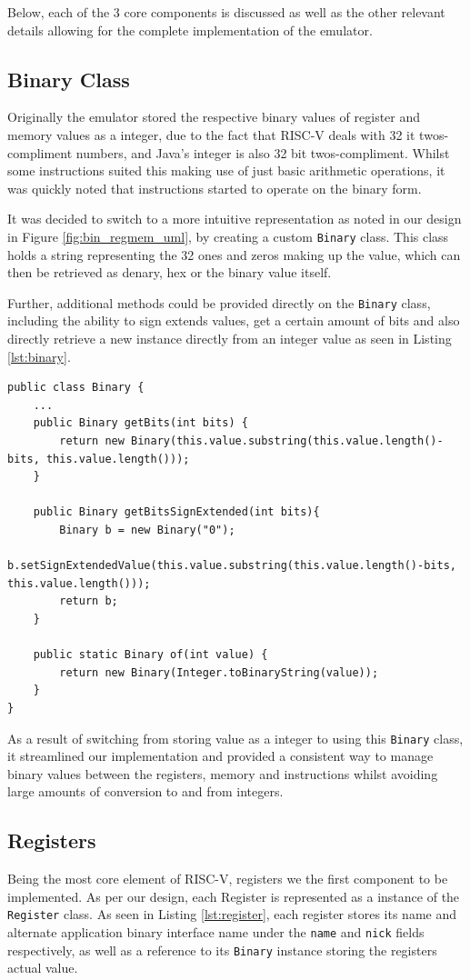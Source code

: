 Below, each of the 3 core components is discussed as well as the other relevant details allowing for the complete implementation of the emulator.

\subsection{Binary Class}
Originally the emulator stored the respective binary values of register and memory values as a integer, due to the fact that RISC-V deals with 32 it twos-compliment numbers, and Java's integer is also 32 bit twos-compliment. Whilst some instructions suited this making use of just basic arithmetic operations, it was quickly noted that instructions started to operate on the binary form.

It was decided to switch to a more intuitive representation as noted in our design in Figure \ref{fig:bin_regmem_uml}, by creating a custom \texttt{Binary} class. This class holds a string representing the 32 ones and zeros making up the value, which can then be retrieved as denary, hex or the binary value itself.

Further, additional methods could be provided directly on the \texttt{Binary} class, including the ability to sign extends values, get a certain amount of bits and also directly retrieve a new instance directly from an integer value as seen in Listing \ref{lst:binary}.

\begin{lstlisting}[caption=Additional Binary Methods, label=lst:binary]
public class Binary {
    ...
    public Binary getBits(int bits) {
        return new Binary(this.value.substring(this.value.length()-bits, this.value.length()));
    }

    public Binary getBitsSignExtended(int bits){
        Binary b = new Binary("0");
        b.setSignExtendedValue(this.value.substring(this.value.length()-bits, this.value.length()));
        return b;
    }

    public static Binary of(int value) {
        return new Binary(Integer.toBinaryString(value));
    }
}
\end{lstlisting}

As a result of switching from storing value as a integer to using this \texttt{Binary} class, it streamlined our implementation and provided a consistent way to manage binary values between the registers, memory and instructions whilst avoiding large amounts of conversion to and from integers.

\subsection{Registers}
Being the most core element of RISC-V, registers we the first component to be implemented. As per our design, each Register is represented as a instance of the \texttt{Register} class. As seen in Listing \ref{lst:register}, each register stores its name and alternate application binary interface name under the \texttt{name} and \texttt{nick} fields respectively, as well as a reference to its \texttt{Binary} instance storing the registers actual value.

